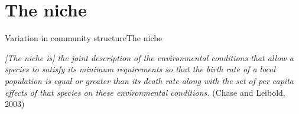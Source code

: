 \documentclass{eecslides}
\begin{document}


	\section{The niche}

	\begin{frame}{Variation in community structure}{The niche}
		\begin{center}
			\textit{\alert{[The niche is] the joint description of the environmental conditions that allow a species to satisfy its minimum requirements so that the birth rate of a local population is equal or greater than its death rate along with the set of per capita effects of that species on these environmental conditions.}} (Chase and Leibold, 2003)
		\end{center}
		
	\end{frame}

\end{document}
